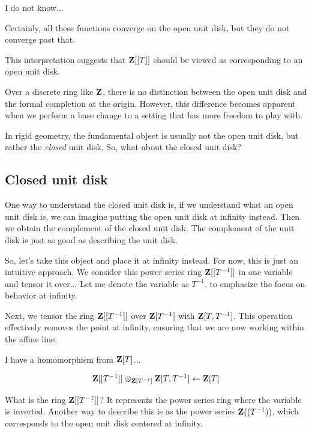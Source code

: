 \gabber I do not know...

\clausen Certainly, all these functions converge on the open unit disk, but they do not converge past that. 


This interpretation suggests that $\mathbf Z[[T]]$ should be viewed as corresponding to an open unit disk. 

Over a discrete ring like $\mathbf Z$, there is no distinction between the open unit disk and the formal completion at the origin. However, this difference becomes apparent when we perform a base change to a setting that has more freedom to play with.

In rigid geometry, the fundamental object is usually not the open unit disk, but rather the \emph{closed} unit disk. So, what about the closed unit disk?

\subsection{Closed unit disk}

One way to understand the closed unit disk is, if we understand what an open unit disk is, we can imagine putting the open unit disk at infinity instead. Then we obtain the complement of the closed unit disk. The complement of the unit disk is just as good as describing the unit disk.

So, let's take this object and place it at infinity instead. For now, this is just an intuitive approach. We consider this power series ring $\mathbf Z[[T^{-1}]]$ in one variable and tensor it over... Let me denote the variable as $T^{-1}$, to emphasize the focus on behavior at infinity.

Next, we tensor the ring $\mathbf Z[[T^{-1}]]$ over $\mathbf Z[T^{-1}]$ with $\mathbf Z[T, T^{-1}]$. This operation effectively removes the point at infinity, ensuring that we are now working within the affine line.

I have a homomorphism from $\mathbf Z[T]$... 

\begin{align*}
\mathbf Z[[T^{-1}]] \otimes_{\mathbf Z[T^{-1}]} \mathbf Z[T, T^{-1}] \leftarrow \mathbf Z[T]
\end{align*}

What is the ring $\mathbf Z[[T^{-1}]]$? It represents the power series ring where the variable is inverted. Another way to describe this is as the power series $\mathbf Z((T^{-1}))$, which corresponds to the open unit disk centered at infinity.


